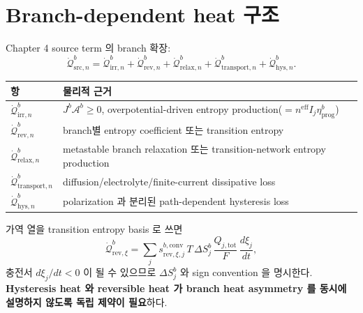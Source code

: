 \documentclass[11pt,a4paper]{article}
\newcommand{\eff}{\mathrm{eff}}
\newcommand{\tot}{\mathrm{tot}}
\newcommand{\irr}{\mathrm{irr}}
\newcommand{\rev}{\mathrm{rev}}
\newcommand{\src}{\mathrm{src}}
\newcommand{\rlx}{\mathrm{relax}}
\newcommand{\prog}{\mathrm{prog}}
\newcommand{\conv}{\mathrm{conv}}
\newcommand{\transp}{\mathrm{transport}}
\newcommand{\hys}{\mathrm{hys}}
\begin{document}
\section{Branch-dependent heat 구조}\label{sec:ch5_branchheat}
Chapter 4 source term 의 branch 확장:
\begin{equation}
\dot{\mathcal Q}_{\src,n}^b=\dot{\mathcal Q}_{\irr,n}^b+\dot{\mathcal Q}_{\rev,n}^b+\dot{\mathcal Q}_{\rlx,n}^b+\dot{\mathcal Q}_{\transp,n}^b+\dot{\mathcal Q}_{\hys,n}^b.
\label{eq:ch5_branch_heat}
\end{equation}
\begin{longtable}{p{} p{}}
\toprule 항 & 물리적 근거 \\ \midrule \endhead
$\dot{\mathcal Q}_{\irr,n}^b$ & $J^b\mathcal A^b\ge0$, overpotential-driven entropy production($=n^{\eff}I_j\eta_\prog^b$) \\
$\dot{\mathcal Q}_{\rev,n}^b$ & branch별 entropy coefficient 또는 transition entropy \\
$\dot{\mathcal Q}_{\rlx,n}^b$ & metastable branch relaxation 또는 transition-network entropy production \\
$\dot{\mathcal Q}_{\transp,n}^b$ & diffusion/electrolyte/finite-current dissipative loss \\
$\dot{\mathcal Q}_{\hys,n}^b$ & polarization 과 분리된 path-dependent hysteresis loss \\
\bottomrule
\end{longtable}
가역 열을 transition entropy basis 로 쓰면
\begin{equation}
\dot{\mathcal Q}_{\rev,\xi}^b=\sum_j s_{\rev,\xi,j}^{b,\conv}\,T\,\Delta S_j^b\,\frac{Q_{j,\tot}}{F}\,\frac{d\xi_j}{dt},
\label{eq:ch5_branch_rev}
\end{equation}
충전서 $d\xi_j/dt<0$ 이 될 수 있으므로 $\Delta S_j^b$ 와 sign convention 을 명시한다. \textbf{Hysteresis heat
와 reversible heat 가 branch heat asymmetry 를 동시에 설명하지 않도록 독립 제약이 필요}하다.

\end{document}
